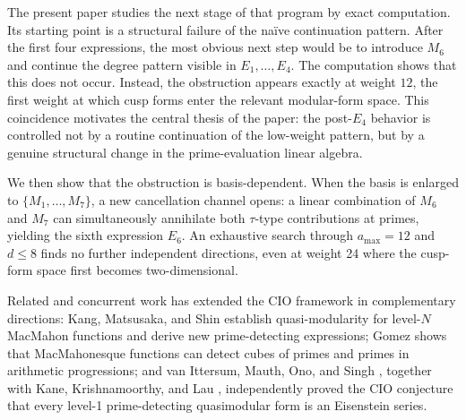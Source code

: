 \documentclass[11pt]{article}
\begin{document}
The present paper studies the next stage of that program by exact computation.
Its starting point is a structural failure of the na\"ive continuation pattern.
After the first four expressions, the most obvious next step would be to introduce $M_6$
and continue the degree pattern visible in $E_1,\dots,E_4$.
The computation shows that this does not occur.
Instead, the obstruction appears exactly at weight $12$, the first weight at which cusp
forms enter the relevant modular-form space.
This coincidence motivates the central thesis of the paper: the post-$E_4$ behavior is
controlled not by a routine continuation of the low-weight pattern, but by a genuine
structural change in the prime-evaluation linear algebra.

We then show that the obstruction is basis-dependent.
When the basis is enlarged to $\{M_1,\dots,M_7\}$, a new cancellation channel opens: a
linear combination of $M_6$ and $M_7$ can simultaneously annihilate both
$\tau$-type contributions at primes, yielding the sixth expression $E_6$.
An exhaustive search through $a_{\max}=12$ and $d\le 8$ finds no further independent
directions, even at weight 24 where the cusp-form space first becomes two-dimensional.

Related and concurrent work has extended the CIO framework in complementary directions:
Kang, Matsusaka, and Shin \cite{KMS2024} establish quasi-modularity for level-$N$
MacMahon functions and derive new prime-detecting expressions; Gomez \cite{Gomez2025}
shows that MacMahonesque functions can detect cubes of primes and primes in arithmetic
progressions; and van Ittersum, Mauth, Ono, and Singh \cite{VIMOS2025}, together with
Kane, Krishnamoorthy, and Lau \cite{KKL2025}, independently proved the CIO conjecture
that every level-1 prime-detecting quasimodular form is an Eisenstein series.
\end{document}

